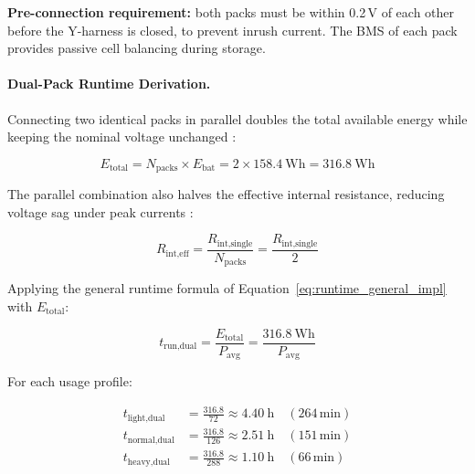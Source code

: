 \documentclass[12pt,a4paper]{report}
\begin{document}
\textbf{Pre-connection requirement:} both packs must be within 0.2\,V of each
other before the Y-harness is closed, to prevent inrush current. The BMS of each
pack provides passive cell balancing during storage.

\paragraph{Dual-Pack Runtime Derivation.}

Connecting two identical packs in parallel doubles the total available
energy while keeping the nominal voltage unchanged \cite{linden2011handbook}:

\begin{equation}
  E_\text{total} = N_\text{packs} \times E_\text{bat}
  = 2 \times \SI{158.4}{\watt\hour} = \SI{316.8}{\watt\hour}
  \label{eq:E_total_impl}
\end{equation}

The parallel combination also halves the effective internal resistance,
reducing voltage sag under peak currents \cite{andrea2010battery}:

\begin{equation}
  R_\text{int,eff} = \frac{R_\text{int,single}}{N_\text{packs}}
  = \frac{R_\text{int,single}}{2}
  \label{eq:R_parallel_impl}
\end{equation}

Applying the general runtime formula of
Equation~\eqref{eq:runtime_general_impl} with $E_\text{total}$:

\begin{equation}
  t_\text{run,dual} = \frac{E_\text{total}}{P_\text{avg}}
  = \frac{\SI{316.8}{\watt\hour}}{P_\text{avg}}
  \label{eq:runtime_dual_gen_impl}
\end{equation}

For each usage profile:

\begin{align}
  t_\text{light,dual}  &= \frac{316.8}{72}  \approx \SI{4.40}{\hour}
  \quad (264\,\text{min})
  \label{eq:t_light_dual_impl} \\[4pt]
  t_\text{normal,dual} &= \frac{316.8}{126} \approx \SI{2.51}{\hour}
  \quad (151\,\text{min})
  \label{eq:t_normal_dual_impl} \\[4pt]
  t_\text{heavy,dual}  &= \frac{316.8}{288} \approx \SI{1.10}{\hour}
  \quad (66\,\text{min})
  \label{eq:t_heavy_dual_impl}
\end{align}
\end{document}
